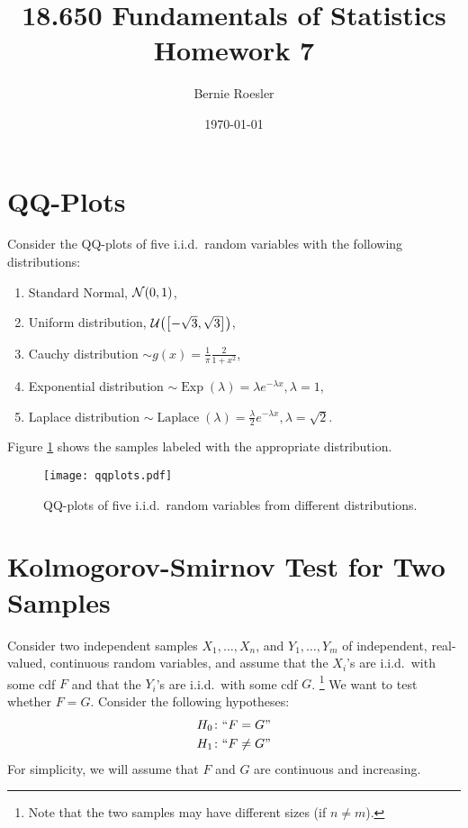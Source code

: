 \documentclass[letterpaper, reqno]{amsart}
\title[Homework 7 -- Problem \thesection]{18.650 Fundamentals of Statistics\\{\large Homework 7}}
\author{Bernie Roesler}
\date{\today}
\numberwithin{equation}{section}
\newcommand{\N}[2]{\mathcal{N}\mleft( #1, #2 \mright)}
\newcommand{\U}[2]{\mathcal{U}\mleft(\mleft[ #1, #2 \mright]\mright)}
\newcommand{\iid}{i.i.d.}
\begin{document}

\graphicspath{{./figures/}}

\maketitle

\section{QQ-Plots}
Consider the QQ-plots of five \iid\ random variables with the following
distributions:
\begin{enumerate}
\item Standard Normal, $\N{0}{1}$,
  \item Uniform distribution, $\U{-\sqrt{3}}{\sqrt{3}}$,
  \item Cauchy distribution $\sim g(x) = \frac{1}{\pi}\frac{2}{1+x^2}$,
  \item Exponential distribution $\sim \operatorname{Exp}(\lambda) = \lambda
    e^{-\lambda x}, \lambda = 1$,
  \item Laplace distribution $\sim \operatorname{Laplace}(\lambda)
    = \frac{\lambda}{2} e^{-\lambda x}, \lambda = \sqrt{2}$.
\end{enumerate}
Figure \ref{fig:qqplots} shows the samples labeled with the appropriate
distribution.

\begin{figure}[!h]
  \centering
  \texttt{[image: qqplots.pdf]}
  \caption{QQ-plots of five \iid\ random variables from different distributions.}
  \label{fig:qqplots}
\end{figure}

\clearpage
\section{Kolmogorov-Smirnov Test for Two Samples}
Consider two independent samples $X_1, \dots, X_n$, and $Y_1, \dots, Y_m$ of
independent, real-valued, continuous random variables, and assume that the $X_i$'s
are \iid\ with some cdf $F$ and that the $Y_i$'s are \iid\ with some cdf $G$.
\footnote{Note that the two samples may have different sizes (if $n \ne m$).}
We want to test whether $F = G$.
Consider the following hypotheses:
\begin{align*}
  H_0 \colon ``F = G" \\
  H_1 \colon ``F \ne G"
\end{align*}
For simplicity, we will assume that $F$ and $G$ are continuous and increasing.
\end{document}
